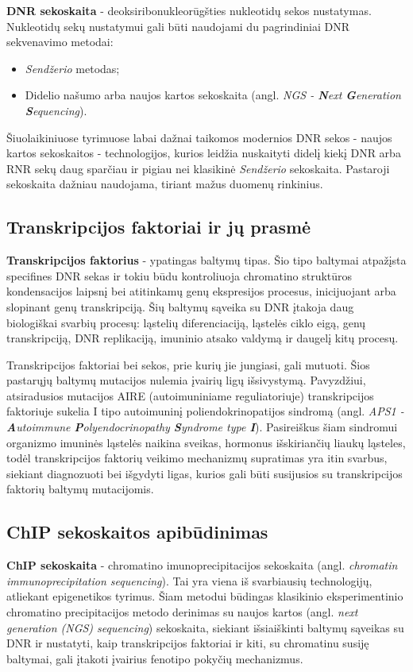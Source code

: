 \documentclass[12pt]{article}
\begin{document}
\textbf{DNR sekoskaita} - deoksiribonukleorūgšties nukleotidų sekos nustatymas.
Nukleotidų sekų nustatymui gali būti naudojami du pagrindiniai DNR sekvenavimo 
metodai:

\begin{itemize}
    \item \emph{Sendžerio} metodas;
    \item Didelio našumo arba naujos kartos sekoskaita
    (angl. \emph{NGS - \textbf{N}ext \textbf{G}eneration \textbf{S}equencing}).
\end{itemize}

Šiuolaikiniuose tyrimuose labai dažnai taikomos modernios DNR sekos - naujos 
kartos se\-kos\-kai\-tos - technologijos, kurios leidžia nuskaityti didelį kiekį
DNR arba RNR sekų daug sparčiau ir pigiau nei klasikinė \emph{Sendžerio} 
sekoskaita. Pastaroji sekoskaita dažniau naudojama, tiriant mažus duomenų
rinkinius.

\subsection{Transkripcijos faktoriai ir jų prasmė}

\textbf{Transkripcijos faktorius} - ypatingas baltymų tipas. Šio tipo baltymai
atpažįsta specifines DNR sekas ir tokiu būdu kontroliuoja chromatino struktūros
kondensacijos laipsnį bei atitinkamų genų ekspresijos procesus, inicijuojant
arba slopinant genų transkripciją. Šių baltymų sąveika su DNR įtakoja daug
biologiškai svarbių procesų: ląstelių diferenciaciją, ląstelės ciklo eigą, genų
transkripciją, DNR replikaciją, imuninio atsako valdymą ir daugelį kitų
procesų\cite{ARTICLE10, ARTICLE11}.

Transkripcijos faktoriai bei sekos, prie kurių jie jungiasi, gali
mutuoti. Šios pastarųjų baltymų mutacijos nulemia įvairių ligų išsivystymą.
Pavyzdžiui, atsiradusios mutacijos AIRE (autoimuniniame reguliatoriuje)
transkripcijos faktoriuje sukelia I tipo autoimuninį poliendokrinopatijos
sindromą\cite{ARTICLE9} (angl. \emph{APS1 - \textbf{A}utoimmune
\textbf{P}olyendocrinopathy \textbf{S}yndrome type \textbf{I}}). Pasireiškus
šiam sindromui organizmo imuninės ląstelės naikina sveikas, hormonus
išskiriančių liaukų ląsteles\cite{ASP1}, todėl transkripcijos faktorių veikimo
mechanizmų supratimas yra itin svarbus, siekiant diagnozuoti bei išgydyti ligas,
kurios gali būti susijusios su transkripcijos faktorių baltymų mutacijomis.

\subsection{ChIP sekoskaitos apibūdinimas}
\textbf{ChIP sekoskaita} - chromatino imunoprecipitacijos sekoskaita (angl.
\emph{chromatin immunoprecipitation sequencing}). Tai yra viena iš svarbiausių
technologijų, atliekant epigenetikos tyrimus\cite{ARTICLE1}. Šiam metodui
būdingas klasikinio eksperimentinio chromatino precipitacijos metodo derinimas
su naujos kartos (angl. \emph{next generation (NGS) sequencing}) sekoskaita,
siekiant išsiaiškinti baltymų sąveikas su DNR ir nustatyti, kaip transkripcijos
faktoriai ir kiti, su chromatinu susiję baltymai, gali įtakoti įvairius fenotipo
pokyčių mechanizmus\cite{ARTICLE2}.
\end{document}
